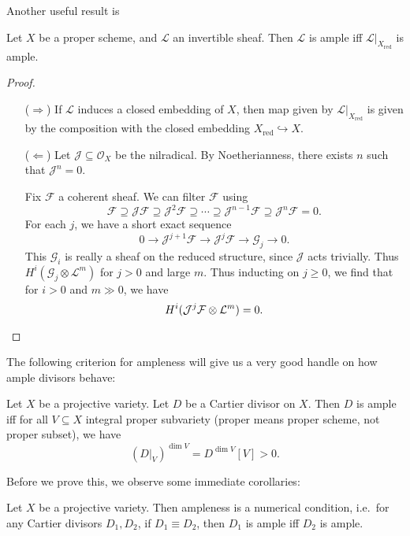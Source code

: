 \documentclass[a4paper]{article}
\DeclareMathOperator\red{red}
\begin{document}
Another useful result is
\begin{prop}
  Let $X$ be a proper scheme, and $\mathcal{L}$ an invertible sheaf. Then $\mathcal{L}$ is ample iff $\mathcal{L}|_{X_{\red}}$ is ample.
\end{prop}

\begin{proof}\leavevmode
  \begin{itemize}
    \item[($\Rightarrow$)] If $\mathcal{L}$ induces a closed embedding of $X$, then map given by $\mathcal{L}|_{X_{\red}}$ is given by the composition with the closed embedding $X_{\red} \hookrightarrow X$.

    \item[($\Leftarrow$)] Let $\mathcal{J} \subseteq \mathcal{O}_X$ be the nilradical. By Noetherianness, there exists $n$ such that $\mathcal{J}^n = 0$.

      Fix $\mathcal{F}$ a coherent sheaf. We can filter $\mathcal{F}$ using
      \[
        \mathcal{F} \supseteq \mathcal{J}\mathcal{F} \supseteq \mathcal{J}^2 \mathcal{F} \supseteq \cdots \supseteq \mathcal{J}^{n - 1} \mathcal{F} \supseteq \mathcal{J}^n \mathcal{F} = 0.
      \]
      For each $j$, we have a short exact sequence
      \[
        0 \to \mathcal{J}^{j + 1} \mathcal{F} \to \mathcal{J}^j \mathcal{F} \to \mathcal{G}_j \to 0.
      \]
      This $\mathcal{G}_i$ is really a sheaf on the reduced structure, since $\mathcal{J}$ acts trivially. Thus $H^i(\mathcal{G}_j \otimes \mathcal{L}^m)$ for $j > 0$ and large $m$. Thus inducting on $j \geq 0$, we find that for $i > 0$ and $m \gg 0$, we have
      \[
        H^i(\mathcal{J}^j \mathcal{F} \otimes \mathcal{L}^m) = 0.\qedhere
      \]%
  \end{itemize}
\end{proof}

The following criterion for ampleness will give us a very good handle on how ample divisors behave:
\begin{thm}
  Let $X$ be a projective variety. Let $D$ be a Cartier divisor on $X$. Then $D$ is ample iff for all $V \subseteq X$ integral proper subvariety (proper means proper scheme, not proper subset), we have
  \[
    (D|_V)^{\dim V} = D^{\dim V} [V] > 0.
  \]
\end{thm}

Before we prove this, we observe some immediate corollaries:
\begin{cor}
  Let $X$ be a projective variety. Then ampleness is a numerical condition, i.e.\ for any Cartier divisors $D_1, D_2$, if $D_1 \equiv D_2$, then $D_1$ is ample iff $D_2$ is ample.
\end{cor}
\end{document}
